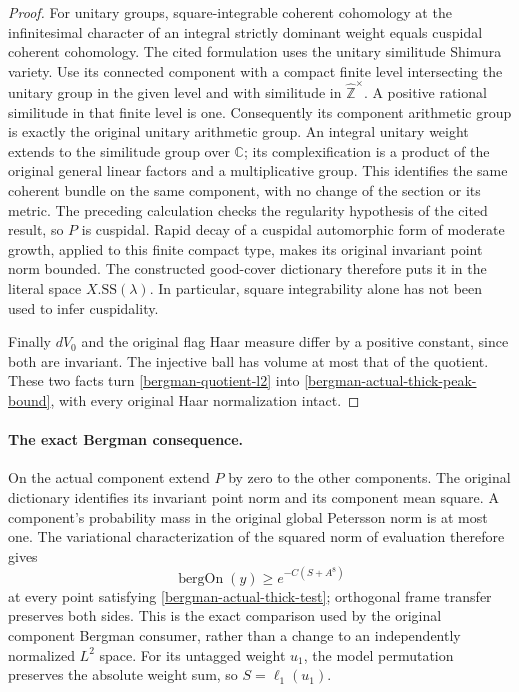 \begin{proof}
For unitary groups, square-integrable coherent cohomology at the
infinitesimal character of an integral strictly dominant weight equals
cuspidal coherent cohomology.\cite{bergman-harris}
The cited formulation uses the unitary similitude Shimura variety.
Use its connected component with a compact finite level intersecting
the unitary group in the given level and with similitude in
$\widehat{\mathbb Z}^{\times}$.  A positive rational similitude in
that finite level is one.  Consequently its component arithmetic
group is exactly the original unitary arithmetic group.
An integral unitary weight extends to the similitude group over
$\mathbb C$; its complexification is a product of the original
general linear factors and a multiplicative group.  This identifies
the same coherent bundle on the same component, with no change of
the section or its metric.  The preceding calculation checks the
regularity hypothesis of the cited result, so $P$ is cuspidal.
Rapid decay of a cuspidal automorphic form of moderate
growth, applied to this finite compact type, makes its original
invariant point norm bounded.\cite{raw-theta-rapid-decay}
The constructed good-cover dictionary therefore puts it in the
literal space $X.\mathrm{SS}(\lambda)$.
In particular, square integrability alone has not been used to infer
cuspidality.

Finally $dV_0$ and the original flag Haar measure differ by a positive
constant, since both are invariant.  The injective ball has volume at
most that of the quotient.  These two facts turn
\eqref{bergman-quotient-l2} into
\eqref{bergman-actual-thick-peak-bound}, with every original Haar
normalization intact.
\end{proof}

\paragraph{The exact Bergman consequence.}
On the actual component extend $P$ by zero to the other components.
The original dictionary identifies its invariant point norm and its
component mean square.  A component's probability mass in the original
global Petersson norm is at most one.  The variational characterization
of the squared norm of evaluation therefore gives
\[
 \operatorname{bergOn}(y)\geq e^{-C(S+A^8)}
\]
at every point satisfying \eqref{bergman-actual-thick-test}; orthogonal
frame transfer preserves both sides.  This is the exact comparison
used by the original component Bergman consumer, rather than a change
to an independently normalized $L^2$ space.
For its untagged weight $u_1$, the model permutation preserves the
absolute weight sum, so $S=\ell_1(u_1)$.

